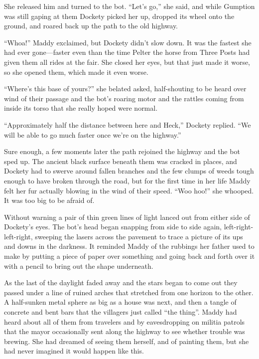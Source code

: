 \documentclass[10pt]{article}
\begin{document}
She released him and turned to the bot. ``Let's go,'' she said, and
while Gumption was still gaping at them Dockety picked her up, dropped
its wheel onto the ground, and roared back up the path to the old
highway.

``Whoa!'' Maddy exclaimed, but Dockety didn't slow down. It was the
fastest she had ever gone---faster even than the time Pelter the horse
from Three Posts had given them all rides at the fair. She closed her
eyes, but that just made it worse, so she opened them, which made it
even worse.

``Where's this base of yours?'' she belated asked, half-shouting to be
heard over wind of their passage and the bot's roaring motor and the
rattles coming from inside its torso that she really hoped were normal.

``Approximately half the distance between here and Heck,'' Dockety
replied. ``We will be able to go much faster once we're on the
highway.''

Sure enough, a few moments later the path rejoined the highway and the
bot sped up. The ancient black surface beneath them was cracked in
places, and Dockety had to swerve around fallen branches and the few
clumps of weeds tough enough to have broken through the road, but for
the first time in her life Maddy felt her fur actually blowing in the
wind of their speed. ``Woo hoo!'' she whooped. It was too big to be
afraid of.

Without warning a pair of thin green lines of light lanced out from
either side of Dockety's eyes. The bot's head began snapping from side
to side again, left-right-left-right, sweeping the lasers across the
pavement to trace a picture of its ups and downs in the darkness. It
reminded Maddy of the rubbings her father used to make by putting a
piece of paper over something and going back and forth over it with a
pencil to bring out the shape underneath.

As the last of the daylight faded away and the stars began to come out
they passed under a line of ruined arches that stretched from one
horizon to the other. A half-sunken metal sphere as big as a house was
next, and then a tangle of concrete and bent bars that the villagers
just called ``the thing''. Maddy had heard about all of them from
travelers and by eavesdropping on militia patrols that the mayor
occasionally sent along the highway to see whether trouble was brewing.
She had dreamed of seeing them herself, and of painting them, but she
had never imagined it would happen like this.
\end{document}
